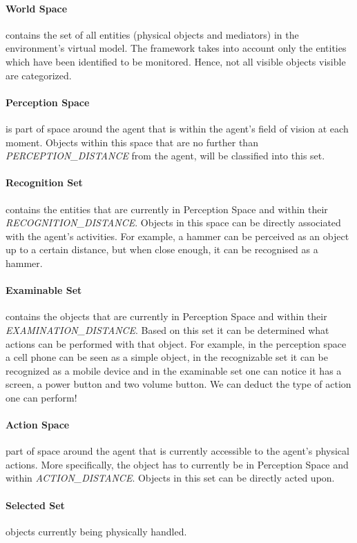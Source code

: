 \paragraph{World Space} contains the set of all entities (physical objects and mediators) in the environment's virtual model. The framework takes into account only the entities which have been identified to be monitored. Hence, not all visible objects visible are categorized.
\paragraph{Perception Space} is part of space around the agent that is within the agent's field of vision at each moment. Objects within this space that are no further than \emph{PERCEPTION\_DISTANCE} from the agent, will be classified into this set.
\paragraph{Recognition Set} contains the entities that are currently in Perception Space and within their \emph{RECOGNITION\_DISTANCE}. Objects in this space can be directly associated with the agent's activities. For example, a hammer can be perceived as an object up to a certain distance, but when close enough, it can be recognised as a hammer.
\paragraph{Examinable Set} contains the objects that are currently in Perception Space and within their \emph{EXAMINATION\_DISTANCE}. Based on this set it can be determined what actions can be performed with that object. For example, in the perception space a cell phone can be seen as a simple object, in the recognizable set it can be recognized as a mobile device and in the examinable set one can notice it has a screen, a power button and two volume button. We can deduct the type of action one can perform!
\paragraph{Action Space} part of space around the agent that is currently accessible to the agent's physical actions. More specifically, the object has to currently be in Perception Space and within \emph{ACTION\_DISTANCE}. Objects in this set can be directly acted upon.
\paragraph{Selected Set} objects currently being physically handled.
